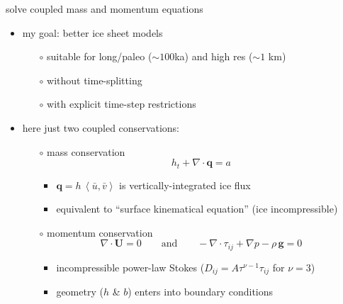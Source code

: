 \documentclass[xcolor={dvipsnames}]{beamer}
\newcommand\bq{\mathbf{q}}
\newcommand\bU{\mathbf{U}}
\newcommand\Div{\nabla\cdot}
\newcommand{\ip}[2]{\ensuremath{\left<#1,#2\right>}}
\begin{document}
\begin{frame}{solve coupled mass and momentum equations}

\begin{itemize}
\item my goal: better ice sheet models 
  \begin{itemize}
  \item[$\circ$] suitable for long/paleo ($\sim 100$ka) and high res ($\sim 1$ km) 
  \item[$\circ$] without time-splitting 
  \item[$\circ$] with explicit time-step restrictions 
  \end{itemize}
\item here just two coupled conservations:
  \begin{itemize}
  \item[$\circ$]  \alert{mass conservation}
\begin{equation*}
h_t + \Div\bq = a
\end{equation*}
    \begin{itemize}
    \vspace{-5mm}
    \item $\bq = h\, \ip{\bar u}{\bar v}$ is vertically-integrated ice flux
    \item equivalent to ``surface kinematical equation'' (ice incompressible)
    \end{itemize}
  \item[$\circ$]  \alert{momentum conservation}
\begin{equation*}
  \nabla \cdot \bU = 0 \qquad \text{and} \qquad - \nabla \cdot \tau_{ij} + \nabla p - \rho\, \mathbf{g} = 0
\end{equation*}
    \begin{itemize}
    \vspace{-5mm}
    \item incompressible power-law Stokes ($D_{ij} = A \tau^{\nu-1} \tau_{ij}$ for $\nu=3$)
    \item geometry ($h$ \& $b$) enters into boundary conditions
    \end{itemize}
  \end{itemize}
\end{itemize}
\end{frame}
\end{document}

